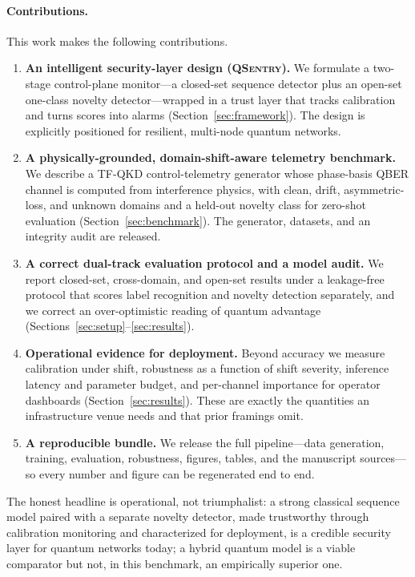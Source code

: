 \documentclass[runningheads]{llncs}
\begin{document}
\paragraph{Contributions.} This work makes the following contributions.
\begin{enumerate}
\item \textbf{An intelligent security-layer design (\textsc{QSentry}).} We formulate a two-stage control-plane monitor---a closed-set sequence detector plus an open-set one-class novelty detector---wrapped in a trust layer that tracks calibration and turns scores into alarms (Section~\ref{sec:framework}). The design is explicitly positioned for resilient, multi-node quantum networks.
\item \textbf{A physically-grounded, domain-shift-aware telemetry benchmark.} We describe a TF-QKD control-telemetry generator whose phase-basis QBER channel is computed from interference physics, with clean, drift, asymmetric-loss, and unknown domains and a held-out novelty class for zero-shot evaluation (Section~\ref{sec:benchmark}). The generator, datasets, and an integrity audit are released.
\item \textbf{A correct dual-track evaluation protocol and a model audit.} We report closed-set, cross-domain, and open-set results under a leakage-free protocol that scores label recognition and novelty detection separately, and we correct an over-optimistic reading of quantum advantage (Sections~\ref{sec:setup}--\ref{sec:results}).
\item \textbf{Operational evidence for deployment.} Beyond accuracy we measure calibration under shift, robustness as a function of shift severity, inference latency and parameter budget, and per-channel importance for operator dashboards (Section~\ref{sec:results}). These are exactly the quantities an infrastructure venue needs and that prior framings omit.
\item \textbf{A reproducible bundle.} We release the full pipeline---data generation, training, evaluation, robustness, figures, tables, and the manuscript sources---so every number and figure can be regenerated end to end.
\end{enumerate}

The honest headline is operational, not triumphalist: a strong classical sequence model paired with a separate novelty detector, made trustworthy through calibration monitoring and characterized for deployment, is a credible security layer for quantum networks today; a hybrid quantum model is a viable comparator but not, in this benchmark, an empirically superior one.
\end{document}
